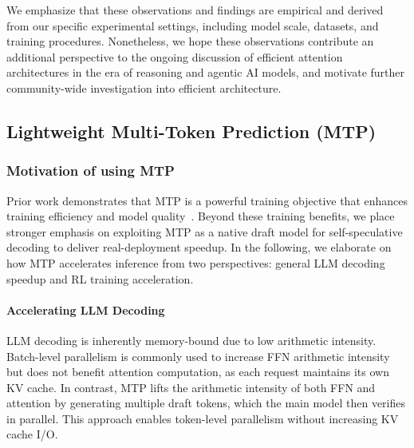 We emphasize that these observations and findings are empirical and derived from our specific experimental settings, including model scale, datasets, and training procedures.
Nonetheless, we hope these observations contribute an additional perspective to the ongoing discussion of efficient attention architectures in the era of reasoning and agentic AI models, and motivate further community-wide investigation into efficient architecture.



\subsection{Lightweight Multi-Token Prediction (MTP)}
\subsubsection{Motivation of using MTP}
Prior work demonstrates that MTP is a powerful training objective that enhances training efficiency and model quality~\citep{gloeckle2024better,liu2024deepseek,xia2025mimo}.
Beyond these training benefits, we place stronger emphasis on exploiting MTP as a native draft model for self-speculative decoding to deliver real-deployment speedup. 
In the following, we elaborate on how MTP accelerates inference from two perspectives: general LLM decoding speedup and RL training acceleration.

\paragraph{Accelerating LLM Decoding}
LLM decoding is inherently memory-bound due to low arithmetic intensity. Batch-level parallelism is commonly used to increase FFN arithmetic intensity but does not benefit attention computation, as each request maintains its own KV cache. In contrast, MTP lifts the arithmetic intensity of both FFN and attention by generating multiple draft tokens, which the main model then verifies in parallel. This approach enables token-level parallelism without increasing KV cache I/O.

